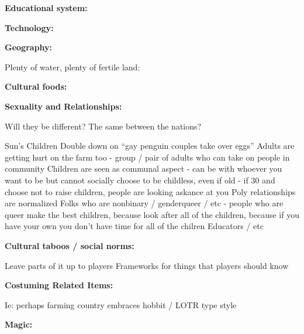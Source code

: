 \documentclass[blue]{GL2020}
\begin{document}
\textbf{Educational system:}

\textbf{Technology:}

\textbf{Geography:}

Plenty of water, plenty of fertile land:

\textbf{Cultural foods:}

\textbf{Sexuality and Relationships:}

Will they be different? The same between the nations?

Sun’s Children
Double down on “gay penguin couples take over eggs”
Adults are getting hurt on the farm too - group / pair of adults who can take on people in community
Children are seen as communal aspect - can be with whoever you want to be but cannot socially choose to be childless, even if old - if 30 and choose not to raise children, people are looking askance at you
Poly relationships are normalized
Folks who are nonbinary / genderqueer / etc - people who are queer make the best children, because look after all of the children, because if you have your own you don’t have time for all of the chilren
Educators / etc

\textbf{Cultural taboos / social norms:}

Leave parts of it up to players
Frameworks for things that players should know

\textbf{Costuming Related Items:}

Ie: perhaps farming country embraces hobbit / LOTR type style

\textbf{Magic:}
\end{document}
